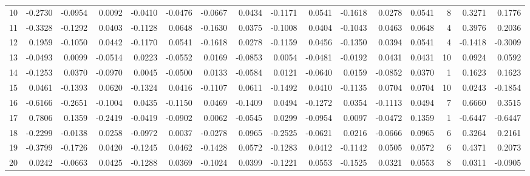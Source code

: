 \begin{tabular}{lrrrrrrrrrrrrrrr}
10  &     -0.2730 & -0.0954 &  0.0092 & -0.0410 & -0.0476 & -0.0667 &  0.0434 & -0.1171 &  0.0541 & -0.1618 &   0.0278 &     0.0541 &      8 &                    0.3271 &                     0.1776 \\
11  &     -0.3328 & -0.1292 &  0.0403 & -0.1128 &  0.0648 & -0.1630 &  0.0375 & -0.1008 &  0.0404 & -0.1043 &   0.0463 &     0.0648 &      4 &                    0.3976 &                     0.2036 \\
12  &      0.1959 & -0.1050 &  0.0442 & -0.1170 &  0.0541 & -0.1618 &  0.0278 & -0.1159 &  0.0456 & -0.1350 &   0.0394 &     0.0541 &      4 &                   -0.1418 &                    -0.3009 \\
13  &     -0.0493 &  0.0099 & -0.0514 &  0.0223 & -0.0552 &  0.0169 & -0.0853 &  0.0054 & -0.0481 & -0.0192 &   0.0431 &     0.0431 &     10 &                    0.0924 &                     0.0592 \\
14  &     -0.1253 &  0.0370 & -0.0970 &  0.0045 & -0.0500 &  0.0133 & -0.0584 &  0.0121 & -0.0640 &  0.0159 &  -0.0852 &     0.0370 &      1 &                    0.1623 &                     0.1623 \\
15  &      0.0461 & -0.1393 &  0.0620 & -0.1324 &  0.0416 & -0.1107 &  0.0611 & -0.1492 &  0.0410 & -0.1135 &   0.0704 &     0.0704 &     10 &                    0.0243 &                    -0.1854 \\
16  &     -0.6166 & -0.2651 & -0.1004 &  0.0435 & -0.1150 &  0.0469 & -0.1409 &  0.0494 & -0.1272 &  0.0354 &  -0.1113 &     0.0494 &      7 &                    0.6660 &                     0.3515 \\
17  &      0.7806 &  0.1359 & -0.2419 & -0.0419 & -0.0902 &  0.0062 & -0.0545 &  0.0299 & -0.0954 &  0.0097 &  -0.0472 &     0.1359 &      1 &                   -0.6447 &                    -0.6447 \\
18  &     -0.2299 & -0.0138 &  0.0258 & -0.0972 &  0.0037 & -0.0278 &  0.0965 & -0.2525 & -0.0621 &  0.0216 &  -0.0666 &     0.0965 &      6 &                    0.3264 &                     0.2161 \\
19  &     -0.3799 & -0.1726 &  0.0420 & -0.1245 &  0.0462 & -0.1428 &  0.0572 & -0.1283 &  0.0412 & -0.1142 &   0.0505 &     0.0572 &      6 &                    0.4371 &                     0.2073 \\
20  &      0.0242 & -0.0663 &  0.0425 & -0.1288 &  0.0369 & -0.1024 &  0.0399 & -0.1221 &  0.0553 & -0.1525 &   0.0321 &     0.0553 &      8 &                    0.0311 &                    -0.0905 \\

\end{tabular}
